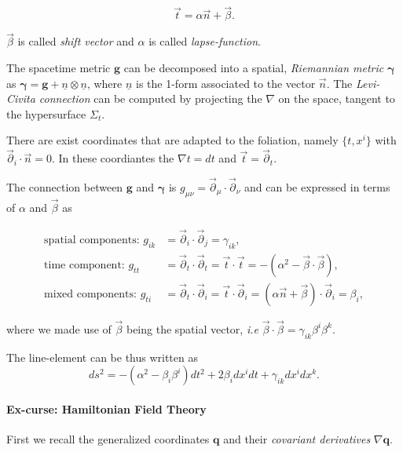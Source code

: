 \begin{equation}
\vec{t} = \alpha\vec{n}+\vec{\beta}.
\end{equation}

$\vec{\beta}$ is called \textit{shift vector} and $\alpha$ is called \textit{lapse-function}. 

The spacetime metric $\boldsymbol{g}$ can be decomposed into a spatial, \textit{Riemannian metric} $\boldsymbol{\gamma}$ as $\boldsymbol{\gamma} = \boldsymbol{g} + \underline{n} \otimes \underline{n}$, where $\underline{n}$ is the 1-form associated to the vector $\vec{n}$. 
The \textit{Levi-Civita connection} can be computed by projecting the $\nabla$ on the space, tangent to the hypersurface $\Sigma_t$.

There are exist coordinates that are adapted to the foliation, namely $\{t, x^i\}$ with $\vec{\partial}_i\cdot \vec{n} = 0$. 
In these coordiantes the $\nabla t = dt$ and $\vec{t} = \vec{\partial}_t$. 

The connection between $\boldsymbol{g}$ and $\boldsymbol{\gamma}$ is $g_{\mu\nu}=\vec{\partial}_{\mu}\cdot\vec{\partial}_{\nu} $ and can be expressed in terms of $\alpha$ and $\vec{\beta}$ as

\begin{align}
\text{spatial components: } g_{ik}&=\vec{\partial}_{i}\cdot\vec{\partial}_{j} =\gamma_{ik}, \\
\text{time component: } g_{tt} &= \vec{\partial}_{t}\cdot\vec{\partial}_{t} = \vec{t}\cdot\vec{t} = - (\alpha^2-\vec{\beta}\cdot\vec{\beta}), \\
\text{mixed components: } g_{ti} &= \vec{\partial}_{t}\cdot\vec{\partial}_{i} = \vec{t}\cdot\vec{\partial}_i = (\alpha\vec{n}+\vec{\beta})\cdot\vec{\partial}_i=\beta_i,
\end{align}

where we made use of $\vec{\beta}$ being the spatial vector, \textit{i.e} $\vec{\beta}\cdot\vec{\beta}=\gamma_{ik}\beta^i\beta^k$.

The line-element can be thus written as
\begin{equation}
ds^2 = -(\alpha^2-\beta_i\beta^i)dt^2 +2\beta_i dx^i dt + \gamma_{ik} dx^i dx^k.
\end{equation}


\paragraph{Ex-curse: Hamiltonian Field Theory}


First we recall the generalized coordinates $\boldsymbol{q}$ and their \textit{covariant derivatives} $\nabla\boldsymbol{q}$. 

